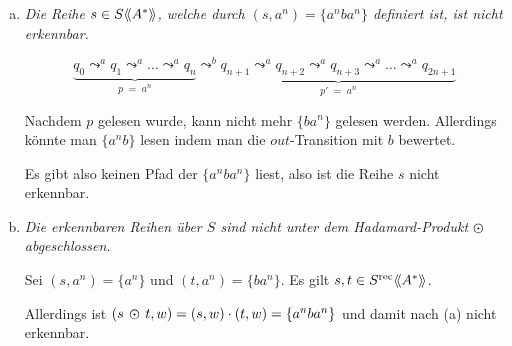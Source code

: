 \documentclass{scrartcl}
\newcommand{\llangle}{\langle\hspace{-0.2em}\langle}
\newcommand{\rrangle}{\rangle\hspace{-0.2em}\rangle}
\begin{document}
\begin{enumerate}[(a)]
    \item \textsl{Die Reihe $s \in S\llangle A^* \rrangle$, welche durch $(s, a^n) = \{a^nba^n\}$ definiert ist, ist nicht erkennbar.}

      \begin{equation*}
        \underbrace{q_0 \leadsto^a q_1 \leadsto^a \ldots \leadsto^a q_n}_{p\;=\;a^n} \leadsto^b \underbrace{q_{n+1} \leadsto^{a} q_{n+2} \leadsto^a q_{n+3} \leadsto^a \ldots \leadsto^a q_{2n+1}}_{p'\;=\;a^n}
      \end{equation*}

      Nachdem $p$ gelesen wurde, kann nicht mehr $\{ba^n\}$ gelesen werden. Allerdings könnte man $\{a^nb\}$ lesen indem man die $out$-Transition mit $b$ bewertet.

      Es gibt also keinen Pfad der $\{a^nba^n\}$ liest, also ist die Reihe $s$ nicht erkennbar.
    \item \textsl{Die erkennbaren Reihen über $S$ sind nicht unter dem Hadamard-Produkt $\varodot$ abgeschlossen.}

      Sei $(s, a^n) = \{a^n\}$ und $(t, a^n) = \{ba^n\}$. Es gilt $s, t \in S^{\text{rec}}\llangle A^* \rrangle$.

      Allerdings ist $(s\,\varodot\,t, w) = (s, w) \cdot (t, w) = \{a^nba^n\}$ und damit nach (a) nicht erkennbar.
\end{enumerate}
\end{document}
